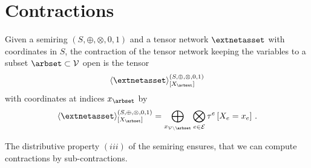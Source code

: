 \documentclass[aps,onecolumn,nofootinbib,pra]{article}
\newcommand{\gensemiring}{(S,\srplus,\srmul,0,1)}
\newcommand{\srcontractionofwrt}[3]{\langle#1\rangle^{#3}_{[#2]}}
\newcommand{\srplus}{\oplus}
\newcommand{\srmul}{\otimes} %
\begin{document}
    \section{Contractions}

    \begin{definition}
        Given a semiring $\gensemiring$ and a tensor network $\extnetasset$ with coordinates in $S$, the contraction of the tensor network keeping the variables to a subset $\arbset\subset\nodes$ open is the tensor
        \begin{align*}
            \srcontractionofwrt{
                \extnetasset
            }{\catvariableof{\arbset}}{\gensemiring}
        \end{align*}
        with coordinates at indices $\catindexof{\arbset}$ by
        \begin{align*}
            \srcontractionofwrt{
                \extnetasset
            }{\catvariableof{\arbset}}{\gensemiring}
            = \bigoplus_{\catindexof{\nodes\backslash\arbset}} \bigotimes_{\edgein} \hypercoreofat{\edge}{\indexedcatvariableof{\edge}} \, .
        \end{align*}
    \end{definition}

    The distributive property $(iii)$ of the semiring ensures, that we can compute contractions by sub-contractions.
\end{document}

